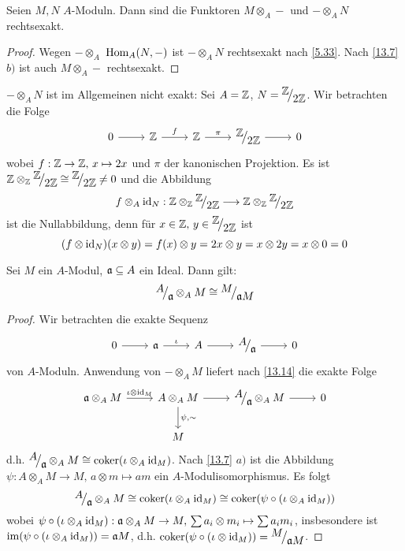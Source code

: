 \begin{fo}\label{13.14}
	Seien $M,N$ $A$-Moduln. Dann sind die Funktoren $M \otimes_A -$ und $-\otimes_A N$ rechtsexakt.
\end{fo}
\begin{proof}
	Wegen $-\otimes_A$  $\operatorname{Hom}_A(N,-)$ ist $-\otimes_A N$ rechtsexakt nach \ref{5.33}. Nach \ref{13.7} $b)$ ist auch $M \otimes_A -$ rechtsexakt.
\end{proof}
\begin{bsp}
	$-\otimes_A N$ ist im Allgemeinen nicht exakt: Sei $A= \mathbb{Z}$, $N = \QR{\Z}{2 \Z}$. Wir betrachten die Folge 
	$$\begin{tikzcd}
	0 \arrow{r} & \Z \arrow{r}{f} & \Z\arrow{r}{\pi} & \QR{\Z}{2\Z} \arrow{r} & 0
	\end{tikzcd}$$
	wobei $f: \mathbb{Z} \to \mathbb{Z}, \, x\mapsto 2x$ und $\pi$ der kanonischen Projektion.
	Es ist $\Z\otimes_\Z\QR{\Z}{2\Z} \cong \QR{\Z}{2\Z} \neq 0$ und die Abbildung
	$$f\otimes_A \id_N : \Z \otimes_\Z \QR{\Z}{2\Z} \longrightarrow \Z \otimes_\Z \QR{\Z}{2\Z}$$
	ist die Nullabbildung, denn für $x\in \Z, \, y\in \QR{\Z}{2\Z}$ ist 
	$$(f \otimes \operatorname{id}_N)(x \otimes y) = f(x) \otimes y = 2x \otimes y = x \otimes 2y = x \otimes 0 = 0$$
\end{bsp}
\begin{bem}\label{13.15}
	Sei $M$ ein $A$-Modul, $\mathfrak{a}\subseteq A$ ein Ideal. Dann gilt:
	$$\QR{A}{\a} \otimes_A M \cong \QR{M}{\a M}$$
\end{bem}
\begin{proof}
	Wir betrachten die exakte Sequenz
	$$\begin{tikzcd}
	0 \arrow{r} & \a \arrow{r}{\iota} & A \arrow{r} & \QR{A}{\a} \arrow{r} & 0 
	\end{tikzcd}$$
	von $A$-Moduln. Anwendung von $-\otimes_AM$ liefert nach \ref{13.14} die exakte Folge 
	$$\begin{tikzcd}
	\a \otimes_A M \arrow{r}{\iota \otimes \id_M} & A\arrow{d}{\psi, \sim} \otimes_AM\arrow{r} & \QR{A }{\a} \otimes_A M \arrow{r} & 0\\
	& M & & 
	\end{tikzcd}$$
	d.h. $\QR{A}{\a} \otimes_AM\cong \coker(\iota\otimes_A \id_M)$. Nach \ref{13.7} $a)$ ist die Abbildung $\psi:A \otimes_A M \to M,\, a \otimes m \mapsto am$ ein $A$-Modulisomorphismus. Es folgt 
	$$\QR{A}{\a} \otimes_A M \cong \coker(\iota\otimes_A \id_M) \cong \coker(\psi\circ (\iota \otimes_A \id_M))$$
	wobei $\psi \circ(\iota\otimes_A \operatorname{id}_M) : \mathfrak{a} \otimes_A M \to M, \, \sum a_i \otimes m_i \mapsto \sum a_i m_i$, insbesondere ist $\operatorname{im}(\psi \circ (\iota \otimes_A \operatorname{id}_M)) = \mathfrak{a} M$, d.h. $\coker(\psi \circ (\iota \otimes \id_M)) = \QR{M}{\a M}$.
\end{proof}
